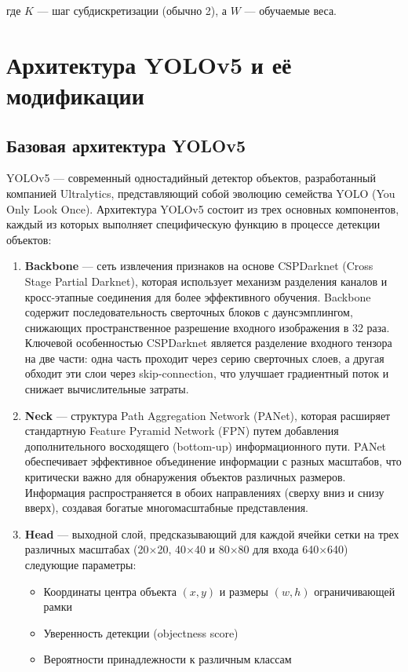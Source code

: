 где $K$ — шаг субдискретизации (обычно 2), а $W$ — обучаемые веса.

\section{Архитектура YOLOv5 и её модификации}
\label{methods:yolov5}

\subsection{Базовая архитектура YOLOv5}
\label{methods:yolov5:base}

YOLOv5 — современный одностадийный детектор объектов, разработанный компанией Ultralytics, представляющий собой эволюцию семейства YOLO (You Only Look Once). Архитектура YOLOv5 состоит из трех основных компонентов, каждый из которых выполняет специфическую функцию в процессе детекции объектов:

\begin{enumerate}
    \item \textbf{Backbone} — сеть извлечения признаков на основе CSPDarknet (Cross Stage Partial Darknet), которая использует механизм разделения каналов и кросс-этапные соединения для более эффективного обучения. Backbone содержит последовательность сверточных блоков с даунсэмплингом, снижающих пространственное разрешение входного изображения в 32 раза. Ключевой особенностью CSPDarknet является разделение входного тензора на две части: одна часть проходит через серию сверточных слоев, а другая обходит эти слои через skip-connection, что улучшает градиентный поток и снижает вычислительные затраты.
    
    \item \textbf{Neck} — структура Path Aggregation Network (PANet), которая расширяет стандартную Feature Pyramid Network (FPN) путем добавления дополнительного восходящего (bottom-up) информационного пути. PANet обеспечивает эффективное объединение информации с разных масштабов, что критически важно для обнаружения объектов различных размеров. Информация распространяется в обоих направлениях (сверху вниз и снизу вверх), создавая богатые многомасштабные представления.
    
    \item \textbf{Head} — выходной слой, предсказывающий для каждой ячейки сетки на трех различных масштабах (20×20, 40×40 и 80×80 для входа 640×640) следующие параметры:
    \begin{itemize}
        \item Координаты центра объекта $(x,y)$ и размеры $(w,h)$ ограничивающей рамки
        \item Уверенность детекции (objectness score)
        \item Вероятности принадлежности к различным классам
    \end{itemize}
\end{enumerate}

